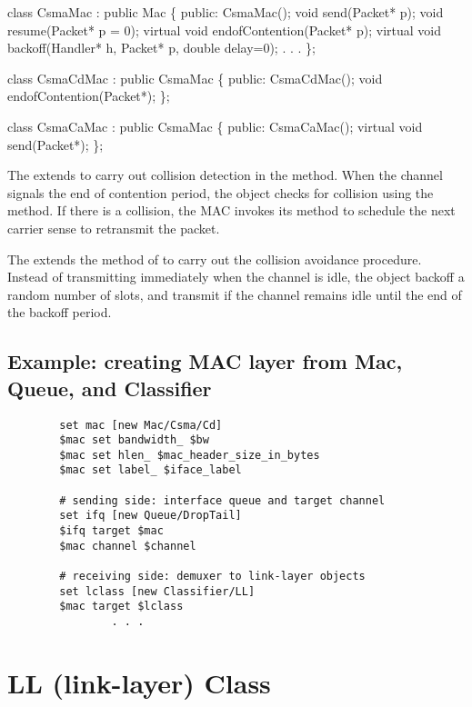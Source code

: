 \begin{program}
    class CsmaMac : public Mac \{
    public:
        CsmaMac();
        void send(Packet* p);
        void resume(Packet* p = 0);
        virtual void endofContention(Packet* p);
        virtual void backoff(Handler* h, Packet* p, double delay=0);
                . . .
    \};

    class CsmaCdMac : public CsmaMac \{
    public:
        CsmaCdMac();
        void endofContention(Packet*);
    \};

    class CsmaCaMac : public CsmaMac \{
    public:
        CsmaCaMac();
        virtual void send(Packet*);
    \};
\end{program}

The  extends  to carry out collision
detection in the  method.  When the channel
signals the end of contention period, the  object checks
for collision using the  method.  If there is
a collision, the MAC invokes its  method to schedule the
next carrier sense to retransmit the packet.

The  extends the  method of  to
carry out the collision avoidance procedure.  Instead of transmitting
immediately when the channel is idle, the  object
backoff a random number of slots, and transmit if the channel remains
idle until the end of the backoff period.

\subsection{Example:  creating MAC layer from Mac, Queue, and Classifier}
\label{ex:maclayer}

\begin{verbatim}
        set mac [new Mac/Csma/Cd]
        $mac set bandwidth_ $bw
        $mac set hlen_ $mac_header_size_in_bytes
        $mac set label_ $iface_label

        # sending side: interface queue and target channel
        set ifq [new Queue/DropTail]
        $ifq target $mac
        $mac channel $channel

        # receiving side: demuxer to link-layer objects
        set lclass [new Classifier/LL]
        $mac target $lclass
                . . .
\end{verbatim}


\section{LL (link-layer) Class}
\label{sec:linklayer}

